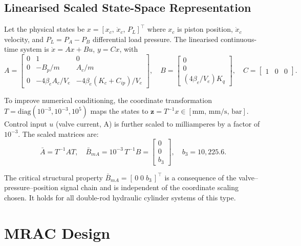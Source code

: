 \documentclass[12pt,a4paper]{article}
\theoremstyle{plain}
\theoremstyle{definition}
\theoremstyle{remark}
\newcommand{\bA}{\bar{A}}       %
\newcommand{\bB}{\bar{B}}       %
\newcommand{\ze}{\mathbf{z}}    %
\begin{document}
\subsection{Linearised Scaled State-Space Representation}

Let the physical states be $x=[x_c,\,\dot x_c,\,P_L]^\top$ where
$x_c$ is piston position, $\dot x_c$ velocity, and
$P_L=P_A-P_B$ differential load pressure.  The linearised
continuous-time system is $\dot x = Ax+Bu$, $y=Cx$, with
\begin{equation}
A = \begin{bmatrix}0&1&0\\0&-B_p/m&A_c/m\\
    0&-4\beta_e A_c/V_e&-4\beta_e(K_c+C_{ip})/V_e\end{bmatrix},\quad
B = \begin{bmatrix}0\\0\\(4\beta_e/V_e)K_q\end{bmatrix}, \quad
C = \begin{bmatrix}1&0&0\end{bmatrix}.
\end{equation}

To improve numerical conditioning, the coordinate transformation
$T=\mathrm{diag}(10^{-3},10^{-3},10^5)$ maps the states to
$\ze = T^{-1}x \in [\mathrm{mm},\,\mathrm{mm/s},\,\mathrm{bar}]$.
Control input $u$ (valve current, A) is further scaled to milliamperes
by a factor of $10^{-3}$.  The scaled matrices are:
\begin{equation}
\bA = T^{-1}AT, \quad
\bB_{mA} = 10^{-3}\,T^{-1}B
           = \begin{bmatrix}0\\0\\b_3\end{bmatrix}, \quad b_3 = 10{,}225.6.
\label{eq:B_structure}
\end{equation}

The critical structural property $\bB_{mA}=[\,0\;0\;b_3\,]^\top$ is
a consequence of the valve--pressure--position signal chain and is
independent of the coordinate scaling chosen.  It holds for all
double-rod hydraulic cylinder systems of this type.

\section{MRAC Design}
\label{sec:mrac}
\end{document}
